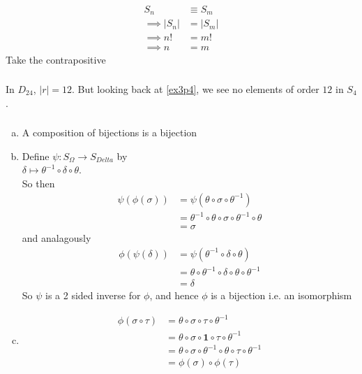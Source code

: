 \documentclass{article}
\newcommand{\inv}[1]{ {#1}^{-1} }
\newcommand{\id}{ \bm{1} }
\newcommand{\iso}{ \equiv }
\newcommand{\comp}{ \circ }
\begin{document}
\subsubsection{}
\begin{align*}
S_n &\iso S_m\\
\implies |S_n| &= |S_m|\\
\implies n! &= m!\\
\implies n &= m
\end{align*}
Take the contrapositive
\subsubsection{}
In $D_{24}$, $|r| = 12$. But looking back at \ref{ex3p4}, we see no elements of order $12$ in $S_4$.
\subsubsection{} 
\begin{enumerate}[(a)]
\item A composition of bijections is a bijection
\item Define $\psi: S_{\Omega} \to S_{Delta}$ by\\
$\delta \mapsto \inv{\theta} \comp \delta \comp \theta$.\\
So then
\begin{align*}
\psi(\phi(\sigma)) &= \psi(\theta\comp\sigma\comp\inv{\theta})\\
&= \inv{\theta}\comp\theta\comp\sigma\comp\inv{\theta}\comp\theta\\
&= \sigma
\end{align*}
and analagously
\begin{align*}
\phi(\psi(\delta)) &= \psi(\inv{\theta}\comp\delta\comp{\theta})\\
&= \theta\comp\inv{\theta}\comp\delta\comp\theta\comp\inv{\theta}\\
&= \delta
\end{align*}
So $\psi$ is a 2 sided inverse for $\phi$, and hence $\phi$ is a bijection i.e. an isomorphism
\item 
\begin{align*}
\phi(\sigma\comp\tau) &= \theta\comp\sigma\comp\tau\comp\inv{\theta}\\
&= \theta\comp\sigma\comp \id \comp\tau\comp\inv{\theta}\\
&= \theta\comp\sigma\comp \inv{\theta}\comp\theta \comp\tau\comp\inv{\theta}\\
&= \phi(\sigma)\comp\phi(\tau)
\end{align*}
\end{enumerate}
\end{document}

